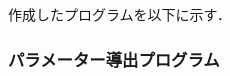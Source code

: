 \begin{center}
    \section*{}                      %
    \vspace*{-2zh}
\end{center}


作成したプログラムを以下に示す．

\subsubsection{パラメーター導出プログラム}

